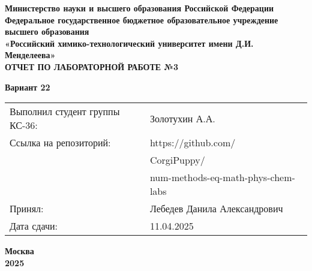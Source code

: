 \documentclass[12pt, a4paper]{report}
\begin{document}
	\begin{titlepage}
		\begin{center}
			\large \textbf{Министерство науки и высшего образования Российской Федерации} \\
			\large \textbf{Федеральное государственное бюджетное образовательное учреждение высшего образования} \\
			\large \textbf{«Российский химико-технологический университет имени Д.И. Менделеева»} \\

			\vspace*{4cm}
			\LARGE \textbf{ОТЧЕТ ПО ЛАБОРАТОРНОЙ РАБОТЕ №3}

			\vspace*{1cm}
			\LARGE \textbf{Вариант 22}

			\vspace*{4cm}
			\begin{flushright}
				\Large
				\begin{tabular}{>{\raggedleft\arraybackslash}p{9cm} p{10cm}}
					Выполнил студент группы КС-36: & Золотухин А.А. \\
					Ссылка на репозиторий: & https://github.com/ \\
					& CorgiPuppy/ \\
					& num-methods-eq-math-phys-chem-labs \\
					Принял: & Лебедев Данила Александрович \\
					Дата сдачи: & 11.04.2025 \\
				\end{tabular}
			\end{flushright}

			\vspace*{4cm}
			\Large \textbf{Москва \\ 2025}
		\end{center}
	\end{titlepage}

	\tableofcontents
	\thispagestyle{empty}
	\newpage

\end{document}
